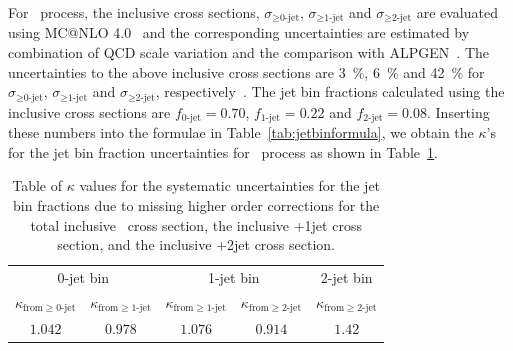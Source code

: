 \begin{table}[!htbp]
\begin{center}
\end{center}
\end{table}

For \qqww\ process, the inclusive cross sections, $\sigma_{\ge\textrm{0-jet}}$,
$\sigma_{\ge\textrm{1-jet}}$ and $\sigma_{\ge\textrm{2-jet}}$ are evaluated using 
MC@NLO 4.0~\cite{Frixione:2002ik} 
and the corresponding uncertainties are estimated by combination of  
QCD scale variation and the comparison with ALPGEN~\cite{Mangano:2002ea}. 
The uncertainties to the above inclusive cross sections are 3~\%,  6~\% and 42~\% for  
$\sigma_{\ge\textrm{0-jet}}$, $\sigma_{\ge\textrm{1-jet}}$ 
and $\sigma_{\ge\textrm{2-jet}}$, respectively~\cite{Dittmaier:2012vm}.  
The jet bin fractions calculated using the inclusive cross sections are 
$f_{\textrm{0-jet}}=0.70$, $f_{\textrm{1-jet}}=0.22$ and $f_{\textrm{2-jet}}=0.08$.
Inserting these numbers into the formulae in Table~\ref{tab:jetbinformula}, 
we obtain the $\kappa$'s for the jet bin fraction uncertainties for \qqww\ process
as shown in Table~\ref{tab:jetbinexcl_ww}. 
%
\begin{table}[!htbp]
\begin{center}
\label{tab:jetbinexcl_ww}
\vspace{0.5cm} 
\caption{ Table of $\kappa$ values for the systematic uncertainties for the jet bin
fractions due to missing higher order corrections for the total inclusive \qqww\
cross section, the inclusive \qqww+1jet cross section, and the inclusive \qqww+2jet
cross section. }
\vspace{0.5cm} 
\begin{tabular}{cc|cc|c}
\hline
\multicolumn{2}{c|}{0-jet bin}  & \multicolumn{2}{c|}{1-jet bin}  & 2-jet bin \\
$\kappa_{\mathrm{from } \ge \textrm{0-jet}}$ & $\kappa_{\mathrm{from } \ge \textrm{1-jet}}$
& $\kappa_{\mathrm{from } \ge \textrm{1-jet}}$ & $\kappa_{\mathrm{from } \ge \textrm{2-jet}}$
& $\kappa_{\mathrm{from } \ge \textrm{2-jet}}$   \\
\hline \hline
$1.042$  & $ 0.978$  & $ 1.076$  & $ 0.914$  & $ 1.42$  \\
\hline
\end{tabular}
\end{center}
\end{table}



